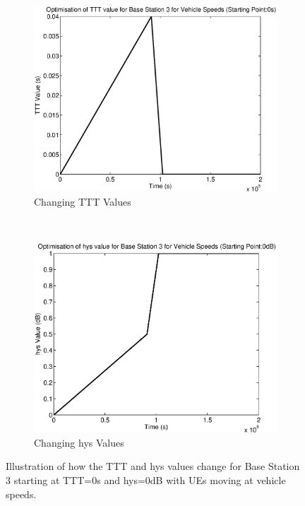 \begin{figure}[H]
        \centering
        \begin{subfigure}[b]{0.49\textwidth}
                \includegraphics[width=\textwidth]{figures/graphs/vehlow/TTT3.eps}
                \caption{Changing TTT Values}
        \end{subfigure}%
        ~ %
        \begin{subfigure}[b]{0.49\textwidth}
                \includegraphics[width=\textwidth]{figures/graphs/vehlow/hys3.eps}
                \caption{Changing hys Values}
        \end{subfigure}
        \caption{Illustration of how the TTT and hys values change for Base Station 3 starting at TTT=0s and hys=0dB with UEs moving at vehicle speeds.}
\end{figure}
